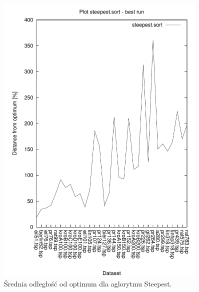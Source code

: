 \begin{figure}
\begin{center}
\includegraphics[width=0.9\textwidth]{wykresy/steepest_sort_best}
\end{center}
\caption{Średnia odległość od optimum dla aglorytmu Steepest.}
\label{fig-3d}
\end{figure}


